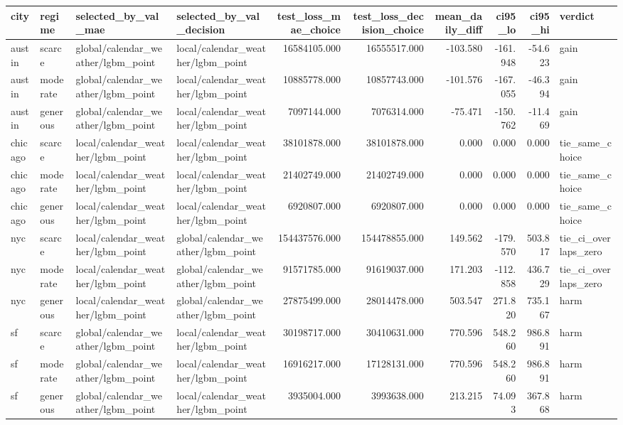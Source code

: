 \begin{tabular}{llllrrrrrl}
\toprule
city & regime & selected\_by\_val\_mae & selected\_by\_val\_decision & test\_loss\_mae\_choice & test\_loss\_decision\_choice & mean\_daily\_diff & ci95\_lo & ci95\_hi & verdict \\
\midrule
austin & scarce & global/calendar\_weather/lgbm\_point & local/calendar\_weather/lgbm\_point & 16584105.000 & 16555517.000 & -103.580 & -161.948 & -54.623 & gain \\
austin & moderate & global/calendar\_weather/lgbm\_point & local/calendar\_weather/lgbm\_point & 10885778.000 & 10857743.000 & -101.576 & -167.055 & -46.394 & gain \\
austin & generous & global/calendar\_weather/lgbm\_point & local/calendar\_weather/lgbm\_point & 7097144.000 & 7076314.000 & -75.471 & -150.762 & -11.469 & gain \\
chicago & scarce & local/calendar\_weather/lgbm\_point & local/calendar\_weather/lgbm\_point & 38101878.000 & 38101878.000 & 0.000 & 0.000 & 0.000 & tie\_same\_choice \\
chicago & moderate & local/calendar\_weather/lgbm\_point & local/calendar\_weather/lgbm\_point & 21402749.000 & 21402749.000 & 0.000 & 0.000 & 0.000 & tie\_same\_choice \\
chicago & generous & local/calendar\_weather/lgbm\_point & local/calendar\_weather/lgbm\_point & 6920807.000 & 6920807.000 & 0.000 & 0.000 & 0.000 & tie\_same\_choice \\
nyc & scarce & local/calendar\_weather/lgbm\_point & global/calendar\_weather/lgbm\_point & 154437576.000 & 154478855.000 & 149.562 & -179.570 & 503.817 & tie\_ci\_overlaps\_zero \\
nyc & moderate & local/calendar\_weather/lgbm\_point & global/calendar\_weather/lgbm\_point & 91571785.000 & 91619037.000 & 171.203 & -112.858 & 436.729 & tie\_ci\_overlaps\_zero \\
nyc & generous & local/calendar\_weather/lgbm\_point & global/calendar\_weather/lgbm\_point & 27875499.000 & 28014478.000 & 503.547 & 271.820 & 735.167 & harm \\
sf & scarce & global/calendar\_weather/lgbm\_point & local/calendar\_weather/lgbm\_point & 30198717.000 & 30410631.000 & 770.596 & 548.260 & 986.891 & harm \\
sf & moderate & global/calendar\_weather/lgbm\_point & local/calendar\_weather/lgbm\_point & 16916217.000 & 17128131.000 & 770.596 & 548.260 & 986.891 & harm \\
sf & generous & global/calendar\_weather/lgbm\_point & local/calendar\_weather/lgbm\_point & 3935004.000 & 3993638.000 & 213.215 & 74.093 & 367.868 & harm \\
\bottomrule
\end{tabular}
